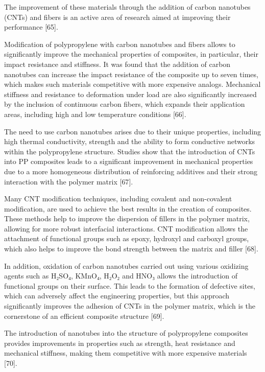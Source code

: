 \begin{multicols}{2}
The improvement of these materials through the addition of carbon
nanotubes (CNTs) and fibers is an active area of research aimed at
improving their performance {[}65{]}.

Modification of polypropylene with carbon nanotubes and fibers allows to
significantly improve the mechanical properties of composites, in
particular, their impact resistance and stiffness. It was found that the
addition of carbon nanotubes can increase the impact resistance of the
composite up to seven times, which makes such materials competitive with
more expensive analogs. Mechanical stiffness and resistance to
deformation under load are also significantly increased by the inclusion
of continuous carbon fibers, which expands their application areas,
including high and low temperature conditions {[}66{]}.

The need to use carbon nanotubes arises due to their unique properties,
including high thermal conductivity, strength and the ability to form
conductive networks within the polypropylene structure. Studies show
that the introduction of CNTs into PP composites leads to a significant
improvement in mechanical properties due to a more homogeneous
distribution of reinforcing additives and their strong interaction with
the polymer matrix {[}67{]}.

Many CNT modification techniques, including covalent and non-covalent
modification, are used to achieve the best results in the creation of
composites. These methods help to improve the dispersion of fillers in
the polymer matrix, allowing for more robust interfacial interactions.
CNT modification allows the attachment of functional groups such as
epoxy, hydroxyl and carboxyl groups, which also helps to improve the
bond strength between the matrix and filler {[}68{]}.

In addition, oxidation of carbon nanotubes carried out using various
oxidizing agents such as H₂SO₄, KMnO₄, H₂O₂ and HNO₃ allows the
introduction of functional groups on their surface. This leads to the
formation of defective sites, which can adversely affect the engineering
properties, but this approach significantly improves the adhesion of
CNTs in the polymer matrix, which is the cornerstone of an efficient
composite structure {[}69{]}.

The introduction of nanotubes into the structure of polypropylene
composites provides improvements in properties such as strength, heat
resistance and mechanical stiffness, making them competitive with more
expensive materials {[}70{]}.


\end{multicols}
